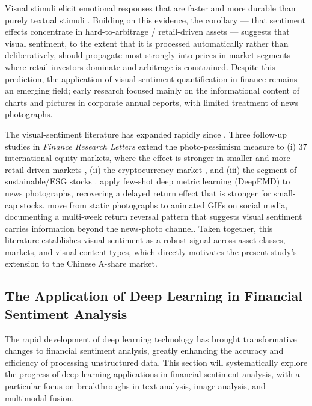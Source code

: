 \documentclass[AER]{AEA}
\begin{document}
Visual stimuli elicit emotional responses that are faster and more durable than purely textual stimuli \citep{powell2015visual}. Building on this evidence, the \citet{baker2007investor} corollary --- that sentiment effects concentrate in hard-to-arbitrage / retail-driven assets --- suggests that visual sentiment, to the extent that it is processed automatically rather than deliberatively, should propagate most strongly into prices in market segments where retail investors dominate and arbitrage is constrained. Despite this prediction, the application of visual-sentiment quantification in finance remains an emerging field; early research focused mainly on the informational content of charts and pictures in corporate annual reports, with limited treatment of news photographs.

The visual-sentiment literature has expanded rapidly since \citet{obaid2022picture}. Three follow-up studies in \emph{Finance Research Letters} extend the photo-pessimism measure to (i) 37 international equity markets, where the effect is stronger in smaller and more retail-driven markets \citep{frl2022photo37}, (ii) the cryptocurrency market \citep{frl2023crypto}, and (iii) the segment of sustainable/ESG stocks \citep{frl2025sustainable}. \citet{ren2025investor} apply few-shot deep metric learning (DeepEMD) to news photographs, recovering a delayed return effect that is stronger for small-cap stocks. \citet{gu2026giffluence} move from static photographs to animated GIFs on social media, documenting a multi-week return reversal pattern that suggests visual sentiment carries information beyond the news-photo channel. Taken together, this literature establishes visual sentiment as a robust signal across asset classes, markets, and visual-content types, which directly motivates the present study's extension to the Chinese A-share market.

\subsection{The Application of Deep Learning in Financial Sentiment Analysis}

The rapid development of deep learning technology has brought transformative changes to financial sentiment analysis, greatly enhancing the accuracy and efficiency of processing unstructured data. This section will systematically explore the progress of deep learning applications in financial sentiment analysis, with a particular focus on breakthroughs in text analysis, image analysis, and multimodal fusion.
\end{document}
